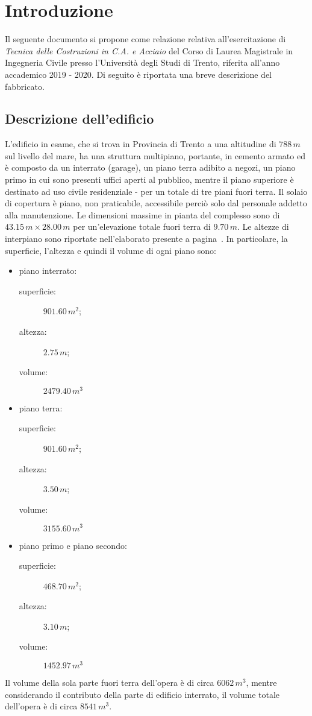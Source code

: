 \pagestyle{plain}
\chapter{Introduzione}\label{chap:intro}
Il seguente documento si propone come relazione relativa all'esercitazione di \emph{Tecnica delle Costruzioni in C.A. e Acciaio}  del Corso di Laurea Magistrale in Ingegneria Civile presso l'Università degli Studi di Trento, riferita all'anno accademico 2019 - 2020. Di seguito è riportata una breve descrizione del fabbricato.
\section{Descrizione dell'edificio}\label{sec:descrizioneEdificio}
L'edificio in esame, che si trova in Provincia di Trento a una altitudine di $788\,m$ sul livello del mare, ha una struttura multipiano, portante, in cemento armato ed è composto da un interrato (garage), un piano terra adibito a negozi, un piano primo in cui sono presenti uffici aperti al pubblico, mentre il piano superiore è destinato ad uso civile residenziale - per un totale di tre piani fuori terra. Il solaio di copertura è piano, non praticabile, accessibile perciò solo dal personale addetto alla manutenzione.
Le dimensioni massime in pianta del complesso sono di $43.15\,m \times 28.00\,m$ per un'elevazione totale fuori terra di $9.70\,m$. Le altezze di interpiano sono riportate nell'elaborato presente a pagina~\pageref{fig:sezione}. 
In particolare, la superficie, l'altezza e quindi il volume di ogni piano sono:
\begin{itemize}
	\item piano interrato:
    \begin{description}
        \item [superficie:] $901.60\,m^2$;
        \item [altezza:] $2.75\,m$;
        \item[volume:] $2479.40\,m^3$ 
    \end{description}
	\item piano terra:
    \begin{description}
        \item [superficie:] $901.60\,m^2$;
        \item [altezza:] $3.50\,m$;
        \item[volume:] $3155.60\,m^3$ 
    \end{description}
	\item piano primo e piano secondo:
		\begin{description}
			\item [superficie:] $468.70\,m^2$;
			\item [altezza:] $3.10\,m$;
			\item[volume:] $1452.97\,m^3$ 
		\end{description}
\end{itemize}
Il volume della sola parte fuori terra dell'opera è di circa $6062\,m^3$, mentre considerando il contributo della parte di edificio interrato, il volume totale dell'opera è di circa $8541\,m^3$.

